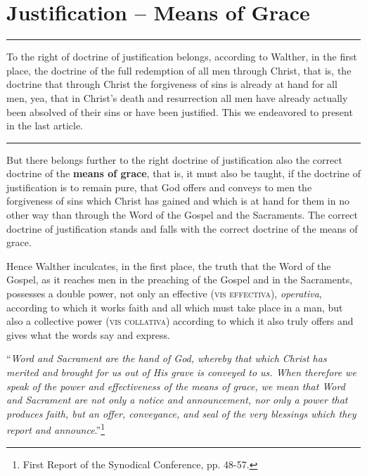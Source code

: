 \chapter{Justification -- Means of Grace}
\hrule
\vspace{.30cm}
To the right of doctrine of justification belongs, according to Walther, in the first place, the doctrine of the full redemption of all men through Christ, that is, the doctrine that through Christ the forgiveness of sins is already at hand for all men, yea, that in Christ’s death and resurrection all men have already actually been absolved of their sins or have been justified.  This we endeavored to present in the last article.
\vspace{.30cm}
\hrule
\vspace{1.25cm}
                But there belongs further to the right doctrine of justification also the correct doctrine of the \textbf{means of grace}, that is, it must also be taught, if the doctrine of justification is to remain pure, that God offers and conveys to men the forgiveness of sins which Christ has gained and which is at hand for them in no other way than through the Word of the Gospel and the Sacraments.  The correct doctrine of justification stands and falls with the correct doctrine of the means of grace.

                Hence Walther inculcates, in the first place, the truth that the Word of the Gospel, as it reaches men in the preaching of the Gospel and in the Sacraments, possesses a double power, not only an effective {\scriptsize\textsc{(vis effectiva)}}, \textit{operativa}, according to which it works faith and all which must take place in a man, but also a collective power {\scriptsize\textsc{(vis collativa)}} according to which it also truly offers and gives what the words say and express.  \begin{displayquote}“\textit{Word and Sacrament are the hand of God, whereby that which Christ has merited and brought for us out of His grave is conveyed to us.  When therefore we speak of the power and effectiveness of the means of grace, we mean that Word and Sacrament are not only a notice and announcement, nor only a power that produces faith, but an offer, conveyance, and seal of the very blessings which they report and announce}.''\footnote{First Report of the Synodical Conference, pp. 48-57.}\end{displayquote}

